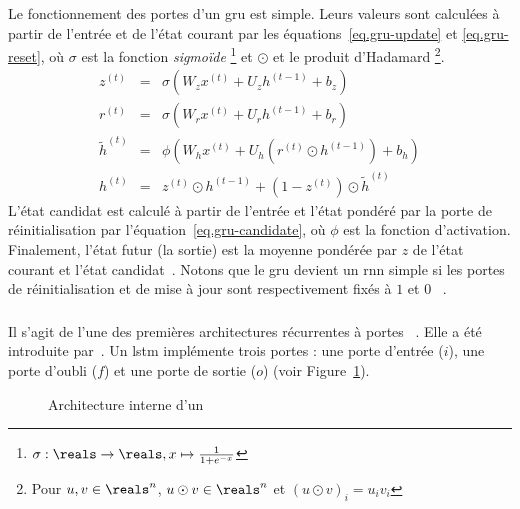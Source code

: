 Le fonctionnement des portes d'un \gls{gru} est simple.
Leurs valeurs sont calculées à partir de l'entrée et de l'état courant par
les équations~\ref{eq.gru-update} et \ref{eq.gru-reset}, 
où \(\sigma\) est la fonction \emph{sigmoïde}%
\footnote{\(\sigma:\reals\to\reals, x\mapsto\frac{1}{1+e^{-x}}\)}
et \(\odot\) et le produit d'Hadamard%
\footnote{Pour \(u, v\in\reals^n\), \(u\odot v\in\reals^n\) et \((u\odot v)_i = u_i v_i\)}.
\begin{eqnarray}
    \label{eq.gru-update}
    z^{(t)}  &=&\sigma\left(W_z x^{(t)}+U_z h^{(t-1)}+b_z\right) \\
    \label{eq.gru-reset}
    r^{(t)}  &=&\sigma\left(W_r x^{(t)}+U_r h^{(t-1)}+b_r\right) \\
    \label{eq.gru-candidate}
    \tilde{h}^{(t)}  &=&\phi\left(W_h x^{(t)}+U_h\left(r^{(t)} \odot h^{(t-1)}\right)+b_h\right) \\
    \label{eq.gru-out}
    h^{(t)}  &=&z^{(t)} \odot h^{(t-1)}+\left(1-z^{(t)}\right) \odot \tilde{h}^{(t)}
\end{eqnarray}
L'état candidat est calculé à partir de l'entrée et l'état pondéré par la porte de réinitialisation
par l'équation~\ref{eq.gru-candidate}, où \(\phi\) est la fonction d'activation.
Finalement, l'état futur (la sortie) est la moyenne pondérée par \(z\) 
de l'état courant et l'état candidat~\cite{Cho_van_Merrienboer_Bahdanau_Bengio_2014}.
Notons que le \gls{gru} devient un \gls{rnn} simple 
si les portes de réinitialisation et de mise à jour sont respectivement fixés à \(1\) et \(0\)%
~\cite{Fathi_2021}.

\subsubsection{}

Il s'agit de l'une des premières architectures récurrentes à portes%
~\cite{Chung_Gulcehre_Cho_Bengio_2014}.
Elle a été introduite par~\cite{Hochreiter_Schmidhuber_1997}.
Un \gls{lstm} implémente trois portes : 
une porte d'entrée (\(i\)), une porte d'oubli (\(f\)) et une porte de sortie (\(o\))%
(voir Figure~\ref{fig.lstm-circuit}).

\begin{figure}[htb]
    \centering
    \resizebox{8cm}{!}{}
    \caption[Architecture interne d'un ]%
    {Architecture interne d'un ~\cite{Chung_Gulcehre_Cho_Bengio_2014}}
    \label{fig.lstm-circuit}
\end{figure}

